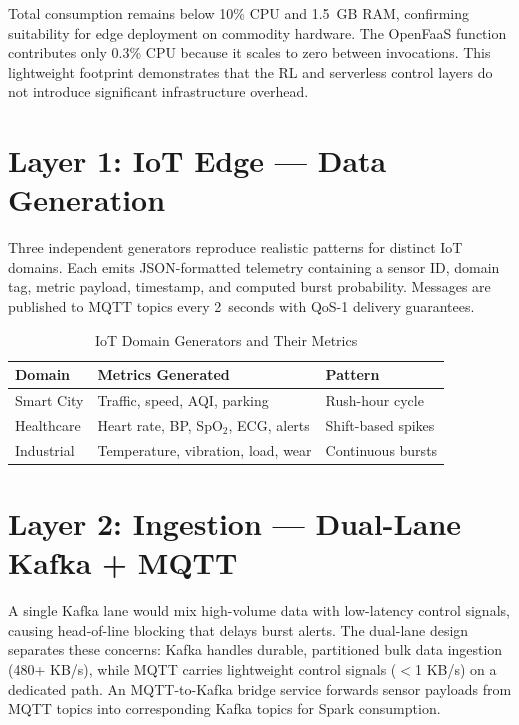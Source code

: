 \noindent Total consumption remains below 10\% CPU and 1.5~GB RAM, confirming
suitability for edge deployment on commodity hardware. The OpenFaaS function contributes
only 0.3\% CPU because it scales to zero between invocations. This lightweight footprint
demonstrates that the RL and serverless control layers do not introduce significant
infrastructure overhead.

\section{Layer 1: IoT Edge — Data Generation}
\label{sec:layer1}
Three independent generators reproduce realistic patterns for distinct IoT domains.
Each emits JSON-formatted telemetry containing a sensor ID, domain tag, metric payload,
timestamp, and computed burst probability. Messages are published to MQTT topics every
2~seconds with QoS-1 delivery guarantees.

\begin{table}[H]
\centering
\caption{IoT Domain Generators and Their Metrics}
\label{tab:iot_domains}
\begin{tabular}{lll}
\toprule
\textbf{Domain}   & \textbf{Metrics Generated}                & \textbf{Pattern} \\
\midrule
Smart City        & Traffic, speed, AQI, parking               & Rush-hour cycle \\
Healthcare        & Heart rate, BP, SpO$_2$, ECG, alerts       & Shift-based spikes \\
Industrial        & Temperature, vibration, load, wear         & Continuous bursts \\
\bottomrule
\end{tabular}
\end{table}

\section{Layer 2: Ingestion — Dual-Lane Kafka + MQTT}
\label{sec:layer2}
A single Kafka lane would mix high-volume data with low-latency control signals,
causing head-of-line blocking that delays burst alerts. The dual-lane design separates
these concerns: Kafka handles durable, partitioned bulk data ingestion (480+ KB/s),
while MQTT carries lightweight control signals ($<$1 KB/s) on a dedicated path.
An MQTT-to-Kafka bridge service forwards sensor payloads from MQTT topics into
corresponding Kafka topics for Spark consumption.

